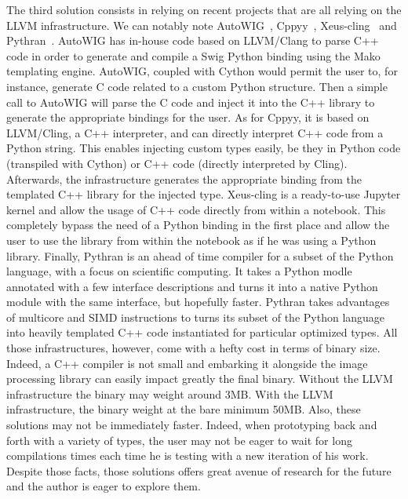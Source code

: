 The third solution consists in relying on recent projects that are all relying on the LLVM infrastructure. We can
notably note AutoWIG~\parencite{fernique.2018.autowig}, Cppyy~\parencite{wimtlplavrijsen.2016.cppyy},
Xeus-cling~\parencite{quantstack.2021.xeus-cling} and Pythran~\parencite{guelton.2015.pythran}. AutoWIG has in-house
code based on LLVM/Clang to parse C++ code in order to generate and compile a Swig Python binding using the Mako
templating engine. AutoWIG, coupled with Cython would permit the user to, for instance, generate C code related to a
custom Python structure. Then a simple call to AutoWIG will parse the C code and inject it into the C++ library to
generate the appropriate bindings for the user. As for Cppyy, it is based on LLVM/Cling, a C++ interpreter, and can
directly interpret C++ code from a Python string. This enables injecting custom types easily, be they in Python code
(transpiled with Cython) or C++ code (directly interpreted by Cling). Afterwards, the infrastructure generates the
appropriate binding from the templated C++ library for the injected type. Xeus-cling is a ready-to-use Jupyter kernel
and allow the usage of C++ code directly from within a notebook. This completely bypass the need of a Python binding in
the first place and allow the user to use the library from within the notebook as if he was using a Python library.
Finally, Pythran is an ahead of time compiler for a subset of the Python language, with a focus on scientific computing.
It takes a Python modle annotated with a few interface descriptions and turns it into a native Python module with the
same interface, but hopefully faster. Pythran takes advantages of multicore and SIMD instructions to turns its subset of
the Python language into heavily templated C++ code instantiated for particular optimized types. All those
infrastructures, however, come with a hefty cost in terms of binary size. Indeed, a C++ compiler is not small and
embarking it alongside the image processing library can easily impact greatly the final binary. Without the LLVM
infrastructure the binary may weight around 3MB. With the LLVM infrastructure, the binary weight at the bare minimum
50MB. Also, these solutions may not be immediately faster. Indeed, when prototyping back and forth with a variety of
types, the user may not be eager to wait for long compilations times each time he is testing with a new iteration of his
work. Despite those facts, those solutions offers great avenue of research for the future and the author is eager to
explore them.
